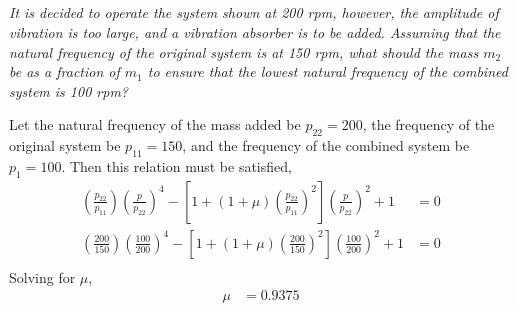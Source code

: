 \subsection{}
\textit{It is decided to operate the system shown at 200 rpm, however, the amplitude of vibration is too large, and a vibration absorber is to be added. Assuming that the natural frequency of the original system is at 150 rpm, what should the mass $m_2$ be as a fraction of $m_1$ to ensure that the lowest natural frequency of the combined system is 100 rpm?}

Let the natural frequency of the mass added be $p_{22} = 200$, the frequency of the original system be $p_{11} = 150$, and the frequency of the combined system be $p_{1} = 100$. Then this relation must be satisfied,
\begin{align*}
    \left(\frac{p_{22}}{p_{11}}\right)\left(\frac{p}{p_{22}}\right)^4 - [1 + (1 + \mu) \left(\frac{p_{22}}{p_{11}}\right)^2] \left(\frac{p}{p_{22}}\right)^2 + 1 &= 0 \\
    \left(\frac{200}{150}\right)\left(\frac{100}{200}\right)^4 - [1 + (1 + \mu) \left(\frac{200}{150}\right)^2] \left(\frac{100}{200}\right)^2 + 1 &= 0 \\
\end{align*}
Solving for $\mu$,
\begin{align*}
    \mu &= 0.9375
\end{align*}


